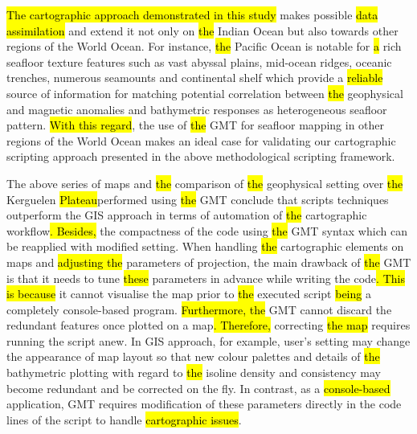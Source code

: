 \documentclass[geomatics,article,submit,pdftex,moreauthors]{Definitions/mdpi}
\begin{document}
\hl{The cartographic approach demonstrated in this study }makes possible \hl{data assimilation} and extend it not only on \hl{the }Indian Ocean but also towards other regions of the World Ocean. For instance, \hl{the }Pacific Ocean is notable for \hl{a }rich seafloor texture features such as vast abyssal plains, mid-ocean ridges, oceanic trenches, numerous seamounts and continental shelf which provide a \hl{reliable} source of information for matching potential correlation between \hl{the }geophysical and magnetic anomalies and bathymetric responses as heterogeneous seafloor pattern. \hl{With this regard}, the use of \hl{the }GMT\hl{ }for seafloor mapping in other regions of the World Ocean makes an ideal case for validating our cartographic scripting approach presented in the above methodological scripting framework. 

The above series of maps and \hl{the }comparison of \hl{the }geophysical setting over \hl{the }Kerguelen \hl{Plateau}performed using \hl{the }GMT conclude that scripts techniques outperform the GIS approach in terms of automation of \hl{the }cartographic workflow\hl{. Besides, }the compactness of the code using \hl{the }GMT syntax which can be reapplied with modified setting. When handling \hl{the }cartographic elements on maps and \hl{adjusting the }parameters of projection, the main drawback of \hl{the }GMT is that it needs to tune \hl{these }parameters\hl{ }in advance while writing the code\hl{. This is because} it cannot visualise the map prior to \hl{the }executed script \hl{being} a completely console-based program. \hl{Furthermore, the} GMT cannot discard the redundant features once plotted on a map\hl{. Therefore, }correcting \hl{the map }requires running the script anew. In GIS approach, for example, user's setting may change the appearance of map layout so that new colour palettes and details of \hl{the }bathymetric plotting with regard to \hl{the }isoline density and consistency may become redundant and be corrected on the fly. In contrast, as a\hl{ console-based} application, GMT requires modification of these parameters directly in the code lines of the script to handle \hl{cartographic issues}. 



\end{document}

